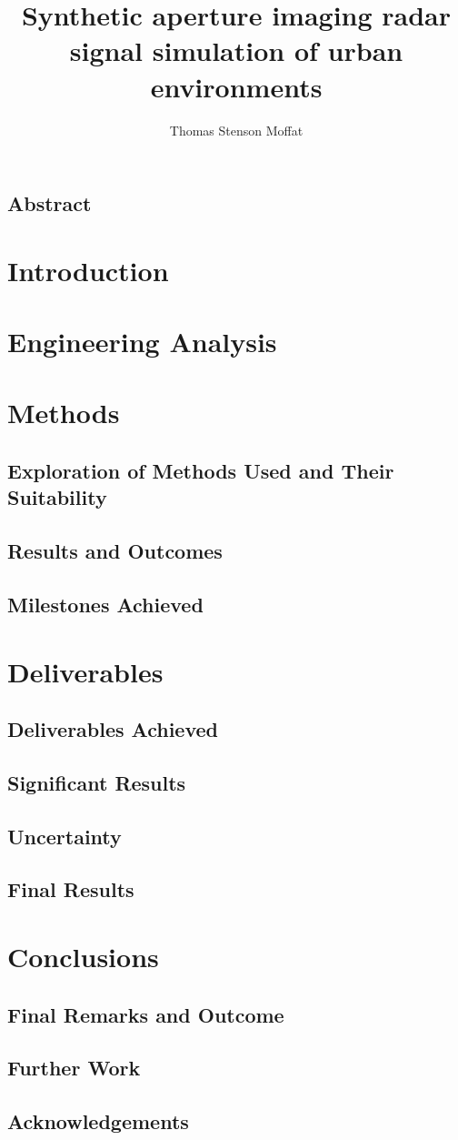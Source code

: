\documentclass[11pt]{report}
\title{Synthetic aperture imaging radar signal simulation of urban environments}
\author{Thomas Stenson Moffat}
\begin{document}

\section*{Abstract}
\newpage
\tableofcontents
\listoffigures
\printglossary[type=symbols,style=long,title={List of Symbols}]
\chapter{Introduction}
\chapter{Engineering Analysis}
\chapter{Methods}
\section{Exploration of Methods Used and Their Suitability}
\section{Results and Outcomes}
\section{Milestones Achieved}
\chapter{Deliverables}
\section{Deliverables Achieved}
\section{Significant Results}
\section{Uncertainty}
\section{Final Results}
\chapter{Conclusions}
\section{Final Remarks and Outcome}
\section{Further Work}
\newpage
\section*{Acknowledgements}
\printbibliography
\end{document}
